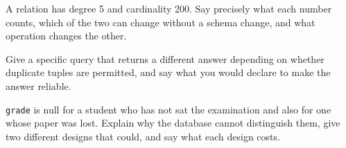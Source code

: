 \begin{checkpoint}
\begin{tightnum}
  \item A relation has degree 5 and cardinality 200. Say precisely what each
        number counts, which of the two can change without a schema change,
        and what operation changes the other.
  \item Give a specific query that returns a different answer depending on
        whether duplicate tuples are permitted, and say what you would declare
        to make the answer reliable.
  \item \texttt{grade} is null for a student who has not sat the examination
        and also for one whose paper was lost. Explain why the database cannot
        distinguish them, give two different designs that could, and say what
        each design costs.
\end{tightnum}
\end{checkpoint}

